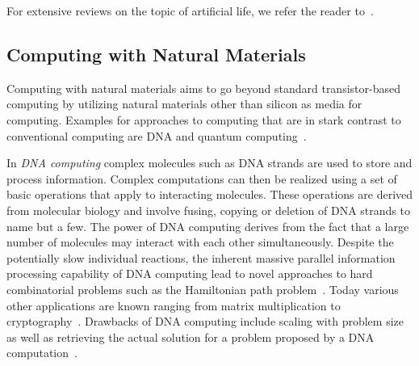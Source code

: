 		For extensive reviews on the topic of artificial life, we refer the reader to~\cite{Langton:1995:ALO:526815,Boden:1996:PAL:525139,bedau2000open,taylor1993artificial}.

		\FloatBarrier

	\subsection{Computing with Natural Materials}

		Computing with natural materials aims to go beyond standard transistor-based computing by utilizing natural materials other than silicon as media for computing. Examples for approaches to computing that are in stark contrast to conventional computing are DNA and quantum computing~\cite{de2007fundamentals}. 

		In \emph{DNA computing} complex molecules such as DNA strands are used to store and process information. Complex computations can then be realized using a set of basic operations that apply to interacting molecules. These operations are derived from molecular biology and involve fusing, copying or deletion of DNA strands to name but a few. The power of DNA computing derives from the fact that a large number of molecules may interact with each other simultaneously. Despite the potentially slow individual reactions, the inherent massive parallel information processing capability of DNA computing lead to novel approaches to hard combinatorial problems such as the Hamiltonian path problem~\cite{adleman1994molecular}. Today various other applications are known ranging from matrix multiplication to cryptography~\cite{puaun2000computing,boneh1996computational,lipton1996breaking,oliver1998computation}. Drawbacks of DNA computing include scaling with problem size as well as retrieving the actual solution for a problem proposed by a DNA computation~\cite{de2007fundamentals}.

